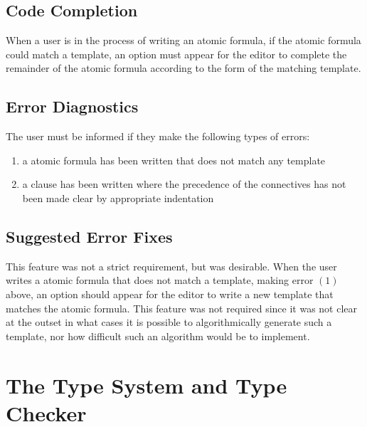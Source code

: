 \documentclass[../main.tex]{subfiles}
\begin{document}

\subsection{Code Completion}
When a user is in the process of writing an atomic formula, if the atomic formula could match a template, an option must appear for the editor to complete the remainder of the atomic formula according to the form of the matching template.

\subsection{Error Diagnostics}
The user must be informed if they make the following types of errors:
\begin{enumerate}
    \item a atomic formula has been written that does not match any template 
    \item a clause has been written where the precedence of the connectives has not been made clear by appropriate indentation
\end{enumerate}

\subsection{Suggested Error Fixes}
This feature was not a strict requirement, but was desirable. When the user writes a atomic formula that does not match a template, making error $(1)$ above, an option should appear for the editor to write a new template that matches the atomic formula. This feature was not required since it was not clear at the outset in what cases it is possible to algorithmically generate such a template, nor how difficult such an algorithm would be to implement.

\section{The Type System and Type Checker}
\end{document}
